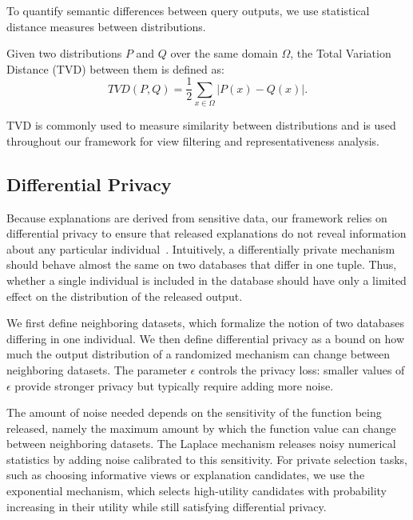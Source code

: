  


To quantify semantic differences between query outputs, we use statistical distance
measures between distributions.

\begin{definition}
Given two distributions $P$ and $Q$ over the same domain $\Omega$, the Total Variation
Distance (TVD) between them is defined as:
\[
TVD(P,Q)
=
\frac{1}{2}
\sum_{x\in\Omega}
|P(x)-Q(x)|.
\]
\end{definition}

TVD is commonly used to measure similarity between distributions and is used throughout
our framework for view filtering and representativeness analysis.

\subsection{Differential Privacy}
\label{subsec:prelim-dp}
Because explanations are derived from sensitive data, our framework
relies on differential privacy to ensure that released explanations do
not reveal information about any particular individual~\cite{dwork2014}. Intuitively, a
differentially private mechanism should behave almost the same on two
databases that differ in one tuple. Thus, whether a single individual is
included in the database should have only a limited effect on the
distribution of the released output.

We first define neighboring datasets, which formalize the notion of two
databases differing in one individual. We then define differential
privacy as a bound on how much the output distribution of a randomized
mechanism can change between neighboring datasets. The parameter
$\epsilon$ controls the privacy loss: smaller values of $\epsilon$
provide stronger privacy but typically require adding more noise.

The amount of noise needed depends on the sensitivity of the function
being released, namely the maximum amount by which the function value can
change between neighboring datasets. The Laplace mechanism releases
noisy numerical statistics by adding noise calibrated to this sensitivity.
For private selection tasks, such as choosing informative views or
explanation candidates, we use the exponential mechanism, which selects
high-utility candidates with probability increasing in their utility
while still satisfying differential privacy.

